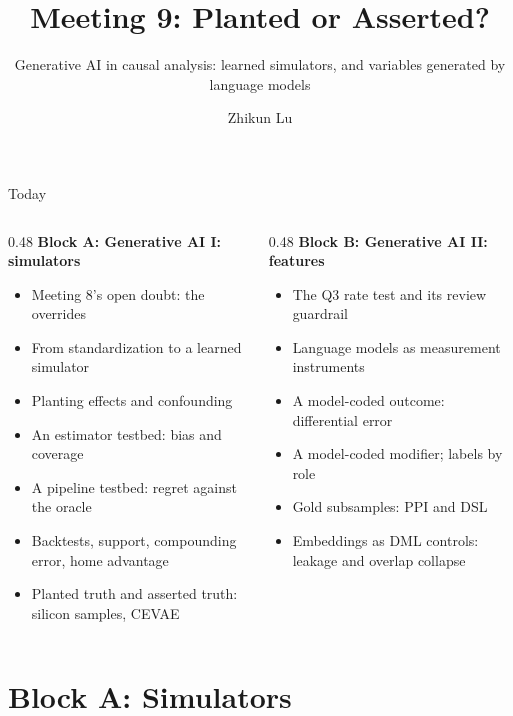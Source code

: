 \documentclass[aspectratio=169, 11pt, handout]{beamer}
\title[Meeting 9]{Meeting 9: Planted or Asserted?}
\subtitle{Generative AI in causal analysis: learned simulators, and variables generated by language models}
\author{Zhikun Lu}
\date{}
\begin{document}
\begin{frame}
\titlepage
\end{frame}

\begin{frame}{Today}

\begin{columns}[T]
\begin{column}{0.48\textwidth}
\textbf{Block A: Generative AI I: simulators}
\begin{itemize}
  \item Meeting 8's open doubt: the overrides
  \item From standardization to a learned simulator
  \item Planting effects and confounding
  \item An estimator testbed: bias and coverage
  \item A pipeline testbed: regret against the oracle
  \item Backtests, support, compounding error, home advantage
  \item Planted truth and asserted truth: silicon samples, CEVAE
\end{itemize}
\end{column}
\begin{column}{0.48\textwidth}
\textbf{Block B: Generative AI II: features}
\begin{itemize}
  \item The Q3 rate test and its review guardrail
  \item Language models as measurement instruments
  \item A model-coded outcome: differential error
  \item A model-coded modifier; labels by role
  \item Gold subsamples: PPI and DSL
  \item Embeddings as DML controls: leakage and overlap collapse
\end{itemize}
\end{column}
\end{columns}
\end{frame}

\section{Block A: Simulators}
\end{document}
